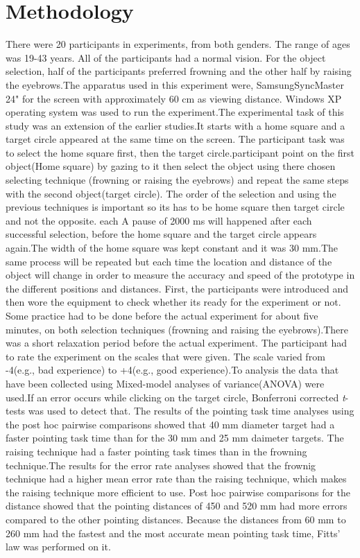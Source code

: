 \documentclass[a4paper]{article}
\begin{document}
\section{Methodology}
	
There were 20 participants in experiments, from both genders. The range of ages was 19-43 years. All of the participants had a normal vision.
For the object selection, half of the participants preferred frowning and the other half by raising the eyebrows.The apparatus used in this experiment 
were, SamsungSyncMaster 24" for the screen with approximately 60 cm as viewing distance. Windows XP operating system was used to run the experiment.The 
experimental task of this study was an extension of the earlier studies.It starts with a home square and a target circle appeared at the same time on the 
screen. The participant task was to select the home square first, then the target circle.participant point on the first object(Home square) by gazing to it 
then select the object using there chosen selecting technique (frowning or raising the eyebrows) and repeat the same steps with the second object(target 
circle). The order of the selection and using the previous techniques is important so its has to be home square then target circle and not the opposite. 
each A pause of 2000 ms will happened after each successful selection, before the home square and the target circle appears again.The width of the home 
square was kept constant and it was 30 mm.The same process will be repeated but each time the location and distance of the object will change in order to 
measure the accuracy and speed of the prototype in the different positions and distances. First, the participants were introduced and then wore the 
equipment to check whether its ready for the experiment or not. Some practice had to be done before the actual experiment for about five minutes, on both 
selection techniques (frowning and raising the eyebrows).There was a short relaxation period before the actual experiment. The participant had to rate the 
experiment on the scales that were given. The scale varied from -4(e.g., bad experience) to +4(e.g., good experience).To analysis the data that have been 
collected using Mixed-model analyses of variance(ANOVA) were used.If an error occurs while clicking on the target circle, Bonferroni corrected {\it t}-
tests was used to detect that. The results of the pointing task time analyses using the post hoc pairwise comparisons showed that 40 mm diameter 
target had a faster pointing task time than for the 30 mm and 25 mm daimeter targets. The raising technique had a faster pointing task times than in the 
frowning technique.The results for the error rate analyses showed that the frownig technique had a higher mean error rate than the raising technique,
which makes the raising technique more efficient to use. Post hoc pairwise comparisons for the distance showed that the pointing distances of 450 and 520 
mm had more errors compared to the other pointing distances. Because the distances from 60 mm to 260 mm had the fastest and the most accurate mean pointing
task time, Fitts' law was performed on it.    	
\end{document}
